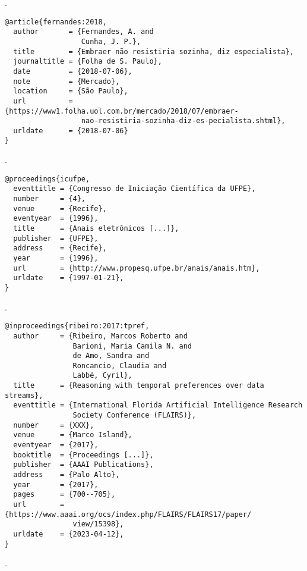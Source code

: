 \noindent
{}.

\vspace*{1em}

\begin{Verbatim}[frame=single]
@article{fernandes:2018,
  author       = {Fernandes, A. and
                  Cunha, J. P.},
  title        = {Embraer não resistiria sozinha, diz especialista},
  journaltitle = {Folha de S. Paulo},
  date         = {2018-07-06},
  note         = {Mercado},
  location     = {São Paulo},
  url          = {https://www1.folha.uol.com.br/mercado/2018/07/embraer-
                  nao-resistiria-sozinha-diz-es-pecialista.shtml},
  urldate      = {2018-07-06}
}
\end{Verbatim}

\noindent
{}.

\vspace*{1em}

\begin{Verbatim}[frame=single]
@proceedings{icufpe,
  eventtitle = {Congresso de Iniciação Científica da UFPE},
  number     = {4},
  venue      = {Recife},
  eventyear  = {1996},
  title      = {Anais eletrônicos [...]},
  publisher  = {UFPE},
  address    = {Recife},
  year       = {1996},
  url        = {http://www.propesq.ufpe.br/anais/anais.htm},
  urldate    = {1997-01-21},
}
\end{Verbatim}

\noindent
{}.

\vspace*{1em}

\begin{Verbatim}[frame=single]
@inproceedings{ribeiro:2017:tpref,
  author     = {Ribeiro, Marcos Roberto and
                Barioni, Maria Camila N. and
                de Amo, Sandra and
                Roncancio, Claudia and
                Labbé, Cyril},
  title      = {Reasoning with temporal preferences over data streams},
  eventtitle = {International Florida Artificial Intelligence Research
                Society Conference (FLAIRS)},
  number     = {XXX},
  venue      = {Marco Island},
  eventyear  = {2017},
  booktitle  = {Proceedings [...]},
  publisher  = {AAAI Publications},
  address    = {Palo Alto},
  year       = {2017},
  pages      = {700--705},
  url        = {https://www.aaai.org/ocs/index.php/FLAIRS/FLAIRS17/paper/
                view/15398},
  urldate    = {2023-04-12},
}
\end{Verbatim}

\noindent
{}.


